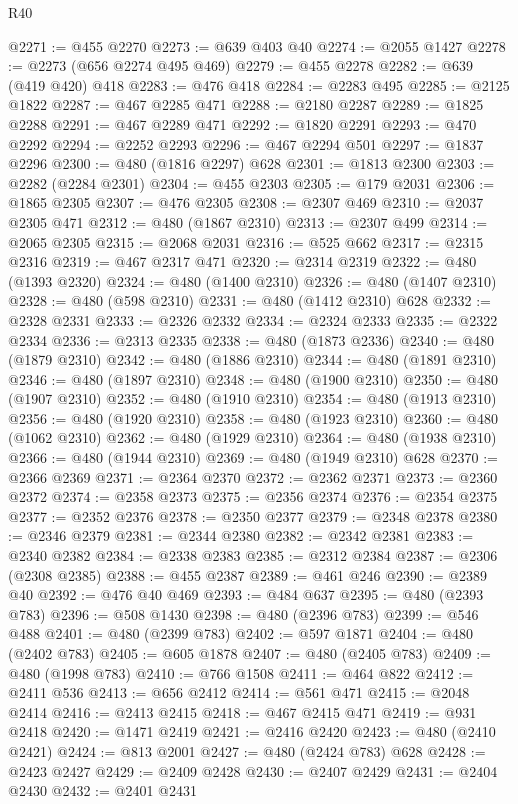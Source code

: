 \begin{lexlean}{R40}
\begin{coremodule}
{{{{{{{{{{{{{{{{{{{{{{{{{{{{{{{{{{{{{{{{{{{{{{{{{{{{{{{{{{{{{{{{{{{{{{{{{{{{{{{{{{{{{{{{{{{{{{{{{{{{{{{{{{{{{@2271 := @455 @2270
@2273 := @639 @403 @40
@2274 := @2055 @1427
@2278 := @2273 (@656 @2274 @495 @469)
@2279 := @455 @2278
@2282 := @639 (@419 @420) @418
@2283 := @476 @418
@2284 := @2283 @495
@2285 := @2125 @1822
@2287 := @467 @2285 @471
@2288 := @2180 @2287
@2289 := @1825 @2288
@2291 := @467 @2289 @471
@2292 := @1820 @2291
@2293 := @470 @2292
@2294 := @2252 @2293
@2296 := @467 @2294 @501
@2297 := @1837 @2296
@2300 := @480 (@1816 @2297) @628
@2301 := @1813 @2300
@2303 := @2282 (@2284 @2301)
@2304 := @455 @2303
@2305 := @179 @2031
@2306 := @1865 @2305
@2307 := @476 @2305
@2308 := @2307 @469
@2310 := @2037 @2305 @471
@2312 := @480 (@1867 @2310)
@2313 := @2307 @499
@2314 := @2065 @2305
@2315 := @2068 @2031
@2316 := @525 @662
@2317 := @2315 @2316
@2319 := @467 @2317 @471
@2320 := @2314 @2319
@2322 := @480 (@1393 @2320)
@2324 := @480 (@1400 @2310)
@2326 := @480 (@1407 @2310)
@2328 := @480 (@598 @2310)
@2331 := @480 (@1412 @2310) @628
@2332 := @2328 @2331
@2333 := @2326 @2332
@2334 := @2324 @2333
@2335 := @2322 @2334
@2336 := @2313 @2335
@2338 := @480 (@1873 @2336)
@2340 := @480 (@1879 @2310)
@2342 := @480 (@1886 @2310)
@2344 := @480 (@1891 @2310)
@2346 := @480 (@1897 @2310)
@2348 := @480 (@1900 @2310)
@2350 := @480 (@1907 @2310)
@2352 := @480 (@1910 @2310)
@2354 := @480 (@1913 @2310)
@2356 := @480 (@1920 @2310)
@2358 := @480 (@1923 @2310)
@2360 := @480 (@1062 @2310)
@2362 := @480 (@1929 @2310)
@2364 := @480 (@1938 @2310)
@2366 := @480 (@1944 @2310)
@2369 := @480 (@1949 @2310) @628
@2370 := @2366 @2369
@2371 := @2364 @2370
@2372 := @2362 @2371
@2373 := @2360 @2372
@2374 := @2358 @2373
@2375 := @2356 @2374
@2376 := @2354 @2375
@2377 := @2352 @2376
@2378 := @2350 @2377
@2379 := @2348 @2378
@2380 := @2346 @2379
@2381 := @2344 @2380
@2382 := @2342 @2381
@2383 := @2340 @2382
@2384 := @2338 @2383
@2385 := @2312 @2384
@2387 := @2306 (@2308 @2385)
@2388 := @455 @2387
@2389 := @461 @246
@2390 := @2389 @40
@2392 := @476 @40 @469
@2393 := @484 @637
@2395 := @480 (@2393 @783)
@2396 := @508 @1430
@2398 := @480 (@2396 @783)
@2399 := @546 @488
@2401 := @480 (@2399 @783)
@2402 := @597 @1871
@2404 := @480 (@2402 @783)
@2405 := @605 @1878
@2407 := @480 (@2405 @783)
@2409 := @480 (@1998 @783)
@2410 := @766 @1508
@2411 := @464 @822
@2412 := @2411 @536
@2413 := @656 @2412
@2414 := @561 @471
@2415 := @2048 @2414
@2416 := @2413 @2415
@2418 := @467 @2415 @471
@2419 := @931 @2418
@2420 := @1471 @2419
@2421 := @2416 @2420
@2423 := @480 (@2410 @2421)
@2424 := @813 @2001
@2427 := @480 (@2424 @783) @628
@2428 := @2423 @2427
@2429 := @2409 @2428
@2430 := @2407 @2429
@2431 := @2404 @2430
@2432 := @2401 @2431
}}}}}}}}}}}}}}}}}}}}}}}}}}}}}}}}}}}}}}}}}}}}}}}}}}}}}}}}}}}}}}}}}}}}}}}}}}}}}}}}}}}}}}}}}}}}}}}}}}}}}}}}}}}}}
\end{coremodule}
\end{lexlean}
